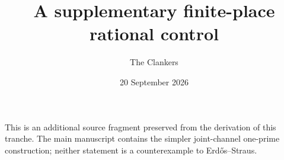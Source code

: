 
\title{A supplementary finite-place rational control}
\author{The Clankers}
\date{20 September 2026}

\maketitle
\noindent This is an additional source fragment preserved from the derivation of
this tranche. The main manuscript contains the simpler joint-channel one-prime
construction; neither statement is a counterexample to Erd\H{o}s--Straus.



